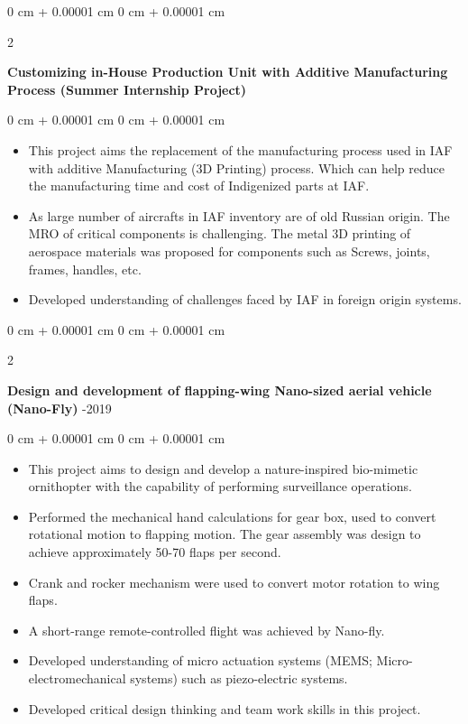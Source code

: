 \documentclass[10pt, letterpaper]{article}
\newenvironment{highlights}{
    \begin{itemize}[
        topsep=0.10 cm,
        parsep=0.10 cm,
        partopsep=0pt,
        itemsep=0pt,
        leftmargin=0 cm + 10pt
    ]
}{
    \end{itemize}
} %
\newenvironment{onecolentry}{
    \begin{adjustwidth}{
        0 cm + 0.00001 cm
    }{
        0 cm + 0.00001 cm
    }
}{
    \end{adjustwidth}
} %
\newenvironment{twocolentry}[2][]{
    \onecolentry
    \def\secondColumn{#2}
    \setcolumnwidth{\fill, 4.5 cm}
    \begin{paracol}{2}
}{
    \switchcolumn \raggedleft \secondColumn
    \end{paracol}
    \endonecolentry
} %
\begin{document}
        \vspace{0.1 cm}

        \begin{twocolentry}{
            2019
        }
            \textbf{Customizing in-House Production Unit with Additive Manufacturing Process (Summer Internship Project)}\end{twocolentry}

        \vspace{0.10 cm}
        \begin{onecolentry}
            \begin{highlights}
                \item This project aims the replacement of the manufacturing process used in IAF with additive Manufacturing (3D Printing) process. Which can help reduce the manufacturing time and cost of Indigenized parts at IAF.
                \item As large number of aircrafts in IAF inventory are of old Russian origin. The MRO of critical components is challenging. The metal 3D printing of aerospace materials was proposed for components such as Screws, joints, frames, handles, etc.
                \item Developed understanding of challenges faced by IAF in foreign origin systems.
            \end{highlights}
        \end{onecolentry}

        \vspace{0.2 cm}

        \begin{twocolentry}{
            2017-2019
        }
            \textbf{Design and development of flapping-wing Nano-sized aerial vehicle (Nano-Fly)}\end{twocolentry}

        \vspace{0.10 cm}
        \begin{onecolentry}
            \begin{highlights}
                \item This project aims to design and develop a nature-inspired bio-mimetic ornithopter with the capability of performing surveillance operations.
                \item Performed the mechanical hand calculations for gear box, used to convert rotational motion to flapping motion. The gear assembly was design to achieve approximately 50-70 flaps per second.
                \item Crank and rocker mechanism were used to convert motor rotation to wing flaps.
                \item A short-range remote-controlled flight was achieved by Nano-fly.
                \item Developed understanding of micro actuation systems (MEMS; Micro-electromechanical systems) such as piezo-electric systems.
                \item Developed critical design thinking and team work skills in this project.
            \end{highlights}
        \end{onecolentry}
        
\end{document}
